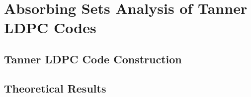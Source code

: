 \chapter[Absorbing Sets of Tanner LDPC Codes]{Absorbing Sets Analysis of Tanner LDPC Codes}

\section{Tanner LDPC Code Construction}

\section{Theoretical Results}\label{theo1}
